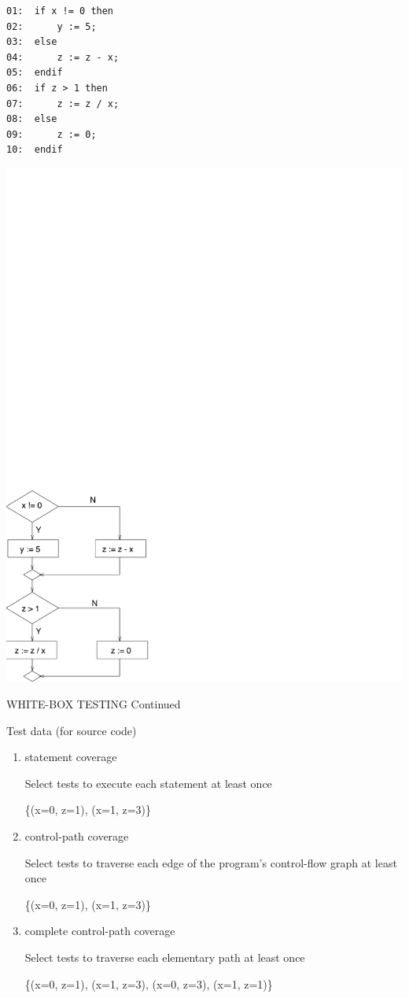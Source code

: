 \begin{minipage}[b]{8cm}
\begin{verbatim}
01:  if x != 0 then
02:      y := 5;
03:  else
04:      z := z - x;
05:  endif
06:  if z > 1 then
07:      z := z / x;
08:  else
09:      z := 0;
10:  endif
\end{verbatim}
\end{minipage}
\includegraphics[scale=1]{white-box} 



\newpage
\centerline{WHITE-BOX TESTING Continued} 

\bigskip

Test data (for source code)

\begin{enumerate}

\item statement coverage

Select tests to execute each statement at least once

\{(x=0, z=1), (x=1, z=3)\}

\item control-path coverage

Select tests to traverse each edge of the program's control-flow graph
at least once

\{(x=0, z=1), (x=1, z=3)\}

\item complete control-path coverage

Select tests to traverse each elementary path at least once

\{(x=0, z=1), (x=1, z=3), (x=0, z=3), (x=1, z=1)\}

\end{enumerate}


